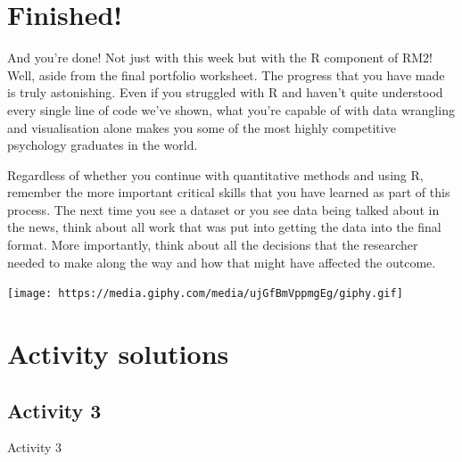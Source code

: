 \documentclass[]{book}
\newenvironment{Shaded}{\begin{snugshade}}{\end{snugshade}}
\newcommand{\CommentTok}[1]{\textcolor[rgb]{0.56,0.35,0.01}{\textit{#1}}}
\newcommand{\DataTypeTok}[1]{\textcolor[rgb]{0.13,0.29,0.53}{#1}}
\newcommand{\KeywordTok}[1]{\textcolor[rgb]{0.13,0.29,0.53}{\textbf{#1}}}
\newcommand{\NormalTok}[1]{#1}
\newcommand{\OperatorTok}[1]{\textcolor[rgb]{0.81,0.36,0.00}{\textbf{#1}}}
\newcommand{\StringTok}[1]{\textcolor[rgb]{0.31,0.60,0.02}{#1}}
\begin{document}
\hypertarget{finished-10}{%
\section{Finished!}\label{finished-10}}

And you're done! Not just with this week but with the R component of RM2! Well, aside from the final portfolio worksheet. The progress that you have made is truly astonishing. Even if you struggled with R and haven't quite understood every single line of code we've shown, what you're capable of with data wrangling and visualisation alone makes you some of the most highly competitive psychology graduates in the world.

Regardless of whether you continue with quantitative methods and using R, remember the more important critical skills that you have learned as part of this process. The next time you see a dataset or you see data being talked about in the news, think about all work that was put into getting the data into the final format. More importantly, think about all the decisions that the researcher needed to make along the way and how that might have affected the outcome.

\texttt{[image: https://media.giphy.com/media/ujGfBmVppmgEg/giphy.gif]}

\hypertarget{activity-solutions-10}{%
\section{Activity solutions}\label{activity-solutions-10}}

\hypertarget{activity-3-6}{%
\subsection{Activity 3}\label{activity-3-6}}

Activity 3

\begin{Shaded}
\end{Shaded}
\end{document}
